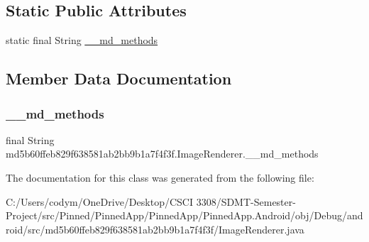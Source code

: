 \subsection*{Static Public Attributes}
\begin{DoxyCompactItemize}
\item 
static final String \hyperlink{classmd5b60ffeb829f638581ab2bb9b1a7f4f3f_1_1_image_renderer_a270ae274b970d099f33432d32109ce8b}{\+\_\+\+\_\+md\+\_\+methods}
\end{DoxyCompactItemize}


\subsection{Member Data Documentation}
\mbox{\label{classmd5b60ffeb829f638581ab2bb9b1a7f4f3f_1_1_image_renderer_a270ae274b970d099f33432d32109ce8b}} 
\subsubsection{\texorpdfstring{\+\_\+\+\_\+md\+\_\+methods}{\_\_md\_methods}}
{\footnotesize\ttfamily final String md5b60ffeb829f638581ab2bb9b1a7f4f3f.\+Image\+Renderer.\+\_\+\+\_\+md\+\_\+methods\hspace{0.3cm}{\ttfamily [static]}}



The documentation for this class was generated from the following file\+:\begin{DoxyCompactItemize}
\item 
C\+:/\+Users/codym/\+One\+Drive/\+Desktop/\+C\+S\+C\+I 3308/\+S\+D\+M\+T-\/\+Semester-\/\+Project/src/\+Pinned/\+Pinned\+App/\+Pinned\+App/\+Pinned\+App.\+Android/obj/\+Debug/android/src/md5b60ffeb829f638581ab2bb9b1a7f4f3f/Image\+Renderer.\+java\end{DoxyCompactItemize}
